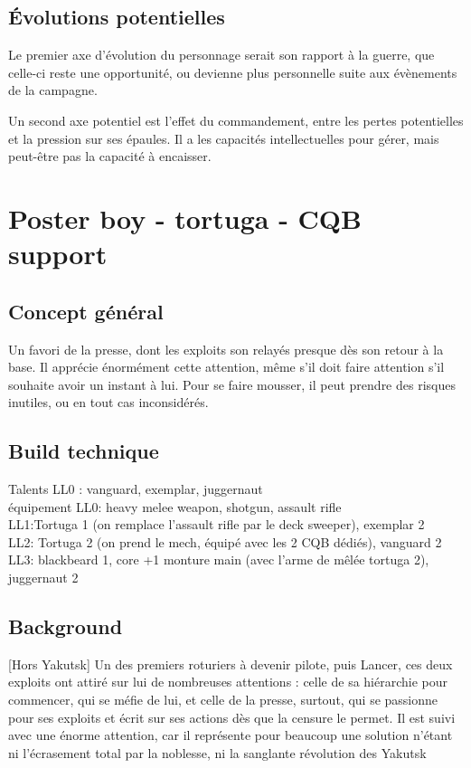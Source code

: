 \documentclass[10pt,a4paper]{article}
\begin{document}
\subsection{Évolutions potentielles}
Le premier axe d'évolution du personnage serait son rapport à la guerre, que celle-ci reste une opportunité, ou devienne plus personnelle suite aux évènements de la campagne.

Un second axe potentiel est l'effet du commandement, entre les pertes potentielles et la pression sur ses épaules. Il a les capacités intellectuelles pour gérer, mais peut-être pas la capacité à encaisser.

\section{Poster boy - tortuga - CQB support}
\subsection{Concept général}
Un favori de la presse, dont les exploits son relayés presque dès son retour à la base. Il apprécie énormément cette attention, même s'il doit faire attention s'il souhaite avoir un instant à lui. Pour se faire mousser, il peut prendre des risques inutiles, ou en tout cas inconsidérés.
\subsection{Build technique}
Talents LL0 : vanguard, exemplar, juggernaut \\
équipement LL0: heavy melee weapon, shotgun, assault rifle\\
LL1:Tortuga 1 (on remplace l'assault rifle par le deck sweeper), exemplar 2\\
LL2: Tortuga 2 (on prend le mech, équipé avec les 2 CQB dédiés), vanguard 2\\
LL3: blackbeard 1, core +1 monture main (avec l'arme de mêlée tortuga 2), juggernaut 2
\subsection{Background}
[Hors Yakutsk] Un des premiers roturiers à devenir pilote, puis Lancer, ces deux exploits ont attiré sur lui de nombreuses attentions : celle de sa hiérarchie pour commencer, qui se méfie de lui, et celle de la presse, surtout, qui se passionne pour ses exploits et écrit sur ses actions dès que la censure le permet. Il est suivi avec une énorme attention, car il représente pour beaucoup une solution n'étant ni l'écrasement total par la noblesse, ni la sanglante révolution des Yakutsk
\end{document}
